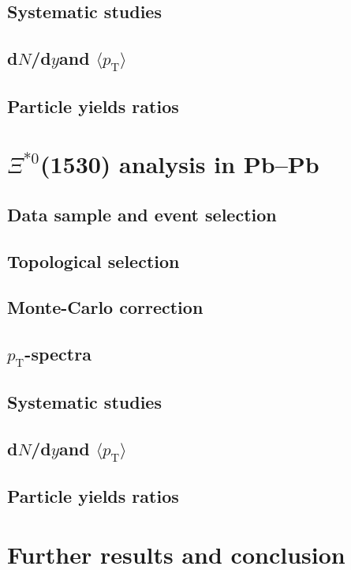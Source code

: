 \documentclass[11pt, oneside]{article}   	%
\newcommand{\xis}{\Xi^{*0}}
\newcommand{\pt}{\ensuremath{p_{\mathrm{T}}}}
\newcommand{\mpt}{\langle p_{\mathrm{T}}\rangle}
\newcommand{\dndy}{d$N$/d$y$}
\begin{document}
\subsection{Systematic studies}
\subsection{\dndy and $\mpt$}
\subsection{Particle yields ratios}

\section{$\xis$(1530) analysis in Pb--Pb }
\subsection{Data sample and event selection}
\subsection{Topological selection}
\subsection{Monte-Carlo correction}
\subsection{$\pt$-spectra}
\subsection{Systematic studies}
\subsection{\dndy and $\mpt$}
\subsection{Particle yields ratios}


\section{Further results and conclusion}
\end{document}
